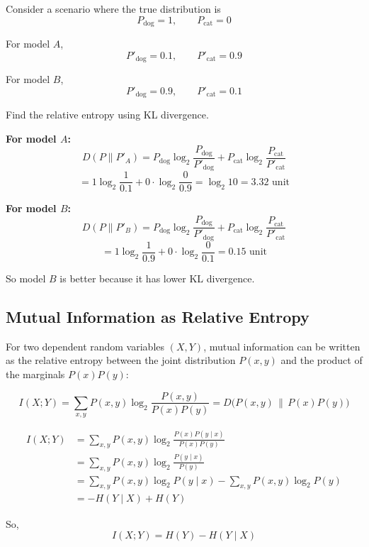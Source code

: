 \documentclass[11pt,a4paper]{book}
\newenvironment{formulabox}[1][Formula]{%
    \begin{tcolorbox}[
        enhanced,
        breakable,
        colback=softcoral!10,
        colframe=softcoral!200,
        title=#1,
        fonttitle=\bfseries,
        coltitle=white,
        sharp corners,
        boxrule=1pt,
        left=8pt,
        right=8pt,
        top=6pt,
        bottom=6pt
    ]
}{\end{tcolorbox}}
\newcounter{qna}[chapter]
\renewcommand{\theqna}{\thechapter.\arabic{qna}}
\newenvironment{questionanswerbox}[1][Example]{%
    \refstepcounter{qna}
    \begin{tcolorbox}[
        enhanced,
        breakable,
        colback=softlavender!10,
        colframe=softlavender!200,
        title={#1~\theqna},
        fonttitle=\bfseries,
        coltitle=white,
        colbacktitle=softlavender!200,
        sharp corners,
        boxrule=1pt,
        left=8pt,
        right=8pt,
        top=6pt,
        bottom=6pt
    ]
}{\end{tcolorbox}}
\begin{document}
\begin{questionanswerbox}[Example]
Consider a scenario where the true distribution is
\[
P_{\text{dog}} = 1, \qquad P_{\text{cat}} = 0
\]

For model $A$,
\[
P'_{\text{dog}} = 0.1, \qquad P'_{\text{cat}} = 0.9
\]

For model $B$,
\[
P'_{\text{dog}} = 0.9, \qquad P'_{\text{cat}} = 0.1
\]

Find the relative entropy using KL divergence.

\textbf{For model $A$:}
\[
D(P \parallel P'_A)
= P_{\text{dog}}\log_2\frac{P_{\text{dog}}}{P'_{\text{dog}}}
+ P_{\text{cat}}\log_2\frac{P_{\text{cat}}}{P'_{\text{cat}}}
\]
\[
= 1\log_2\frac{1}{0.1} + 0\cdot\log_2\frac{0}{0.9}
= \log_2 10
= 3.32 \text{ unit}
\]

\textbf{For model $B$:}
\[
D(P \parallel P'_B)
= P_{\text{dog}}\log_2\frac{P_{\text{dog}}}{P'_{\text{dog}}}
+ P_{\text{cat}}\log_2\frac{P_{\text{cat}}}{P'_{\text{cat}}}
\]
\[
= 1\log_2\frac{1}{0.9} + 0\cdot\log_2\frac{0}{0.1}
= 0.15 \text{ unit}
\]

So model $B$ is better because it has lower KL divergence.
\end{questionanswerbox}

\clearpage

\subsection{Mutual Information as Relative Entropy}
For two dependent random variables $(X,Y)$, mutual information can be written as the relative entropy between the joint distribution $P(x,y)$ and the product of the marginals $P(x)P(y)$:

\begin{formulabox}[Mutual Information from Relative Entropy]
\[
I(X;Y) = \sum_{x,y} P(x,y)\log_2 \frac{P(x,y)}{P(x)P(y)}
= D\bigl(P(x,y)\,\|\,P(x)P(y)\bigr)
\]
\end{formulabox}

\begin{align*}
I(X;Y)
&= \sum_{x,y} P(x,y)\log_2 \frac{P(x)P(y \mid x)}{P(x)P(y)} \\
&= \sum_{x,y} P(x,y)\log_2 \frac{P(y \mid x)}{P(y)} \\
&= \sum_{x,y} P(x,y)\log_2 P(y \mid x) - \sum_{x,y} P(x,y)\log_2 P(y) \\
&= -H(Y \mid X) + H(Y)
\end{align*}

So,
\[
I(X;Y) = H(Y) - H(Y \mid X)
\]
\end{document}
